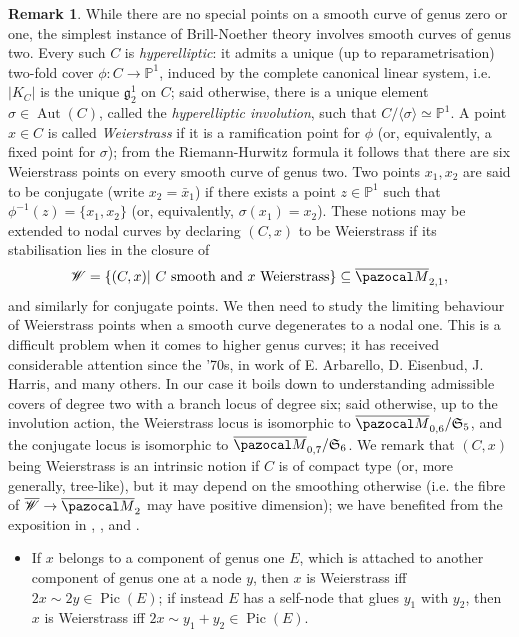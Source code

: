 \documentclass[11pt]{amsart}
\newcommand{\PP}{\mathbb P}
\renewcommand{\to}{\rightarrow}
\newcommand{\oM}{\overline{\pazocal M}}
\newcommand{\Pic}{\operatorname{Pic}}
\newcommand{\Aut}{\operatorname{Aut}}
\theoremstyle{plain}
\theoremstyle{definition}
\newtheorem{rem}[thm]{Remark}
\begin{document}
\begin{rem}\label{rmk:Wandconj}
 While there are no special points on a smooth curve of genus zero or one, the simplest instance of Brill-Noether theory involves smooth curves of genus two. Every such $C$ is \emph{hyperelliptic}: it admits a unique (up to reparametrisation) two-fold cover $\phi\colon C\to\PP^1$, induced by the complete canonical linear system, i.e. $\lvert K_C\rvert$ is the unique $\mathfrak g^1_2$ on $C$; said otherwise, there is a unique element $\sigma\in\Aut(C)$, called the \emph{hyperelliptic involution}, such that $C/\langle\sigma\rangle\simeq\PP^1$. A point $x\in C$ is called \emph{Weierstrass} if it is a ramification point for $\phi$ (or, equivalently, a fixed point for $\sigma$); from the Riemann-Hurwitz formula it follows that there are six Weierstrass points on every smooth curve of genus two. Two points $x_1,x_2$ are said to be conjugate (write $x_2=\bar x_1$) if there exists a point $z\in\PP^1$ such that $\phi^{-1}(z)=\{x_1,x_2\}$ (or, equivalently, $\sigma(x_1)=x_2$). These notions may be extended to nodal curves by declaring $(C,x)$ to be Weierstrass if its stabilisation lies in the closure of
 \[\mathcal W=\{(C,x)|\ C\text{ smooth and } x \text{ Weierstrass}\}\subseteq\oM_{2,1},\]
 and similarly for conjugate points. We then need to study the limiting behaviour of Weierstrass points when a smooth curve degenerates to a nodal one. This is a difficult problem when it comes to higher genus curves; it has received considerable attention since the '70s, in work of E. Arbarello, D. Eisenbud, J. Harris, and many others. In our case it boils down to understanding admissible covers \cite{HarrisMumford} of degree two with a branch locus of degree six; said otherwise, up to the involution action, the Weierstrass locus is isomorphic to $\oM_{0,6}/\mathfrak S_5$, and the conjugate locus is isomorphic to  $\oM_{0,7}/\mathfrak S_6$. We remark that $(C,x)$ being Weierstrass is an intrinsic notion if $C$ is of compact type (or, more generally, tree-like), but it may depend on the smoothing otherwise (i.e. the fibre of $\overline{\mathcal W}\to\oM_2$ may have positive dimension); we have benefited from the exposition in \cite[Appendix 2]{Diaz}, \cite[Proposition (3.0.6)]{Cukierman}, and \cite[Theorem 5.45]{HM}.
 \begin{itemize}[leftmargin=.5cm]
  \item If $x$ belongs to a component of genus one $E$, which is attached to another component of genus one at a node $y$, then $x$ is Weierstrass iff $2x\sim 2y\in\Pic(E)$; if instead $E$ has a self-node that glues $y_1$ with $y_2$, then $x$ is Weierstrass iff $2x\sim y_1+y_2\in\Pic(E)$.
  

\end{itemize}
\end{rem}
\end{document}
